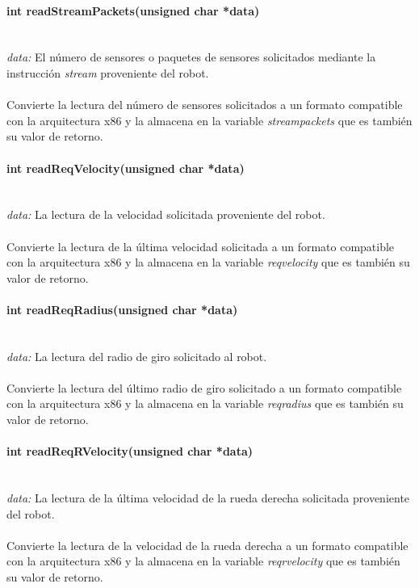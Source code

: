 \documentclass[letterpaper,openright,12pt]{book}
\begin{document}
\paragraph{int readStreamPackets(unsigned char *data)}\mbox{}\\
\emph{data: }El número de sensores o paquetes de sensores solicitados mediante la instrucción \emph{stream} proveniente del robot.\\\\
Convierte la lectura del número de sensores solicitados a un formato compatible con la arquitectura x86 y la almacena en la variable \emph{streampackets} que es también su valor de retorno.\\ 

\paragraph{int readReqVelocity(unsigned char *data)}\mbox{}\\
\emph{data: }La lectura de la velocidad solicitada proveniente del robot.\\\\
Convierte la lectura de la última velocidad solicitada a un formato compatible con la arquitectura x86 y la almacena en la variable \emph{reqvelocity} que es también su valor de retorno.\\ 

\paragraph{int readReqRadius(unsigned char *data)}\mbox{}\\
\emph{data: }La lectura del radio de giro solicitado al robot.\\\\
Convierte la lectura del último radio de giro solicitado a un formato compatible con la arquitectura x86 y la almacena en la variable \emph{reqradius} que es también su valor de retorno.\\ 

\paragraph{int readReqRVelocity(unsigned char *data)}\mbox{}\\
\emph{data: }La lectura de la última velocidad de la rueda derecha solicitada proveniente del robot.\\\\
Convierte la lectura de la velocidad de la rueda derecha a un formato compatible con la arquitectura x86 y la almacena en la variable \emph{reqrvelocity} que es también su valor de retorno.\\ 
\end{document}
